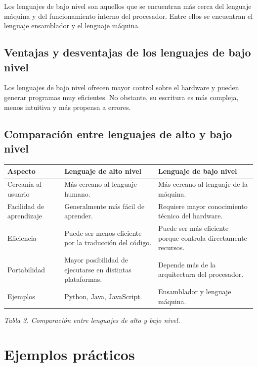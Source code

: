 \documentclass[12pt,a4paper]{article}
\begin{document}
	Los lenguajes de bajo nivel son aquellos que se encuentran más cerca del lenguaje máquina y del funcionamiento interno del procesador. Entre ellos se encuentran el lenguaje ensamblador y el lenguaje máquina.
	
	\subsection{Ventajas y desventajas de los lenguajes de bajo nivel}
	
	Los lenguajes de bajo nivel ofrecen mayor control sobre el hardware y pueden generar programas muy eficientes. No obstante, su escritura es más compleja, menos intuitiva y más propensa a errores.
	
	\subsection{Comparación entre lenguajes de alto y bajo nivel}
	
	\begin{center}
		\begin{tabular}{|p{4cm}|p{5cm}|p{5cm}|}
			\hline
			\textbf{Aspecto} & \textbf{Lenguaje de alto nivel} & \textbf{Lenguaje de bajo nivel} \\ \hline
			Cercanía al usuario & Más cercano al lenguaje humano. & Más cercano al lenguaje de la máquina. \\ \hline
			Facilidad de aprendizaje & Generalmente más fácil de aprender. & Requiere mayor conocimiento técnico del hardware. \\ \hline
			Eficiencia & Puede ser menos eficiente por la traducción del código. & Puede ser más eficiente porque controla directamente recursos. \\ \hline
			Portabilidad & Mayor posibilidad de ejecutarse en distintas plataformas. & Depende más de la arquitectura del procesador. \\ \hline
			Ejemplos & Python, Java, JavaScript. & Ensamblador y lenguaje máquina. \\ \hline
		\end{tabular}
		
		\textit{Tabla 3. Comparación entre lenguajes de alto y bajo nivel.}
	\end{center}
	
	\section{Ejemplos prácticos}
	
\end{document}
